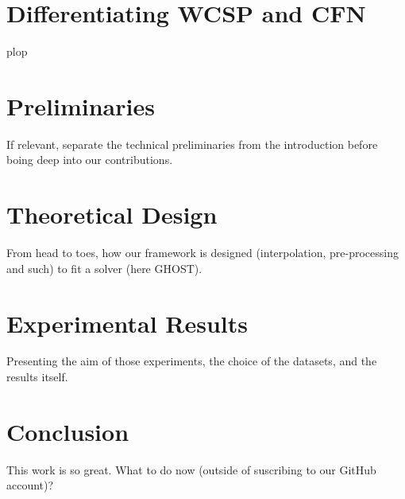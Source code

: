 \documentclass[letterpaper]{article} %
\newcommand{\cfn}{\textsc{CFN}\xspace}
\newcommand{\wcsp}{\textsc{WCSP}\xspace}
\begin{document}
\section{Differentiating \wcsp and \cfn}
plop

\section{Preliminaries}\label{sec:preliminaries}
If relevant, separate the technical preliminaries from the introduction before boing deep into our contributions.

\section{Theoretical Design}\label{sec:theory}
From head to toes, how our framework is designed (interpolation, pre-processing and such) to fit a solver (here GHOST).

\section{Experimental Results}\label{sec:xp}
Presenting the aim of those experiments, the choice of the datasets, and the results itself.

\section{Conclusion}\label{sec:conclusion}
This work is so great. What to do now (outside of suscribing to our GitHub account)?

%


\end{document}
